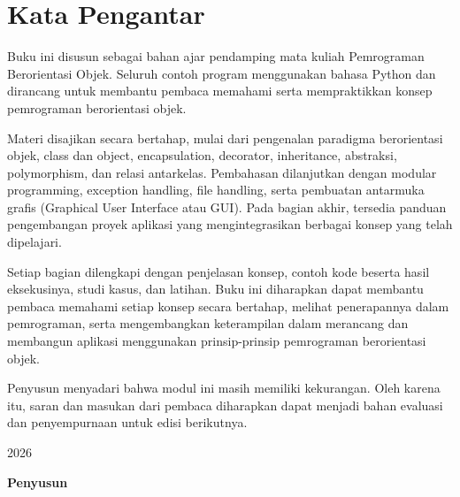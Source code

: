 \documentclass[11pt,a4paper,oneside,openany]{book}
\newcommand{\tahun}{2026}
\newcommand{\versiSampul}{santai}
\begin{document}
\frontmatter
\pagestyle{empty}



\pagestyle{plain}
\subjudul{}
\chapter{Kata Pengantar}

Buku ini disusun sebagai bahan ajar pendamping mata kuliah Pemrograman Berorientasi Objek. Seluruh contoh program menggunakan bahasa Python dan dirancang untuk membantu pembaca memahami serta mempraktikkan konsep pemrograman berorientasi objek.

Materi disajikan secara bertahap, mulai dari pengenalan paradigma berorientasi objek, class dan object, encapsulation, decorator, inheritance, abstraksi, polymorphism, dan relasi antarkelas. Pembahasan dilanjutkan dengan modular programming, exception handling, file handling, serta pembuatan antarmuka grafis (Graphical User Interface atau GUI). Pada bagian akhir, tersedia panduan pengembangan proyek aplikasi yang mengintegrasikan berbagai konsep yang telah dipelajari.

Setiap bagian dilengkapi dengan penjelasan konsep, contoh kode beserta hasil eksekusinya, studi kasus, dan latihan. Buku ini diharapkan dapat membantu pembaca memahami setiap konsep secara bertahap, melihat penerapannya dalam pemrograman, serta mengembangkan keterampilan dalam merancang dan membangun aplikasi menggunakan prinsip-prinsip pemrograman berorientasi objek.

Penyusun menyadari bahwa modul ini masih memiliki kekurangan. Oleh karena itu, saran dan masukan dari pembaca diharapkan dapat menjadi bahan evaluasi dan penyempurnaan untuk edisi berikutnya.

\begin{flushright}
\tahun\par\vspace{14mm}
{\sffamily\bfseries Penyusun}
\end{flushright}

\clearpage
\tableofcontents

\mainmatter
\pagestyle{fancy}
\end{document}
